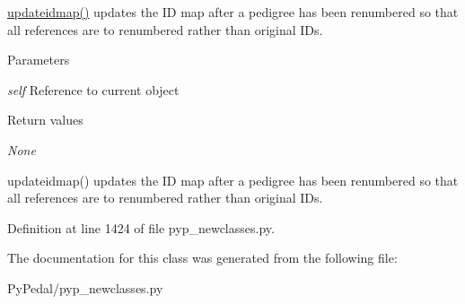 \hyperlink{classPyPedal_1_1pyp__newclasses_1_1NewPedigree_a5f2e95dd43e8bf2b4bfa2907eebd62a1}{updateidmap()} updates the ID map after a pedigree has been renumbered so that all references are to renumbered rather than original IDs. 


\begin{DoxyParams}{Parameters}
\item[{\em self}]Reference to current object \end{DoxyParams}

\begin{DoxyRetVals}{Return values}
\item[{\em None}]\begin{DoxyVerb}
updateidmap() updates the ID map after a pedigree has been renumbered so that
all references are to renumbered rather than original IDs.
\end{DoxyVerb}
 \end{DoxyRetVals}


Definition at line 1424 of file pyp\_\-newclasses.py.



The documentation for this class was generated from the following file:\begin{DoxyCompactItemize}
\item 
PyPedal/pyp\_\-newclasses.py\end{DoxyCompactItemize}
